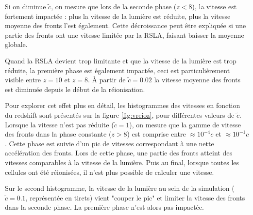 Si on diminue $\tilde{c}$, on mesure que lors de la seconde phase ($z<8$), la vitesse est fortement impactée : plus la vitesse de la lumière est réduite, plus la vitesse moyenne des fronts l'est également.
Cette décroissance peut être expliquée si une partie des fronts ont une vitesse limitée par la \ac{RSLA}, faisant baisser la moyenne globale.

Quand la \ac{RSLA} devient trop limitante et que la vitesse de la lumière est trop réduite, la première phase est également impactée, ceci est particulièrement visible entre $z=10$ et $z=8$.
À partir de $\tilde{c}=0.02$ la vitesse moyenne des fronts est diminuée depuis le début de la réionisation.

Pour explorer cet effet plus en détail, les histogrammes des vitesses en fonction du redshift sont présentés sur la figure \ref{fig:vreioz}, pour différentes valeurs de $\tilde{c}$.
Lorsque la vitesse n'est pas réduite ($\tilde{c}=1$), on mesure que la gamme de vitesse des fronts dans la phase constante ($z>8$) est comprise entre $\approx 10^{-4}c$ et $\approx 10^{-1}c$.
Cette phase est suivie d'un pic de vitesses correspondant à une nette accélération des fronts.
Lors de cette phase, une partie des fronts atteint des vitesses comparables à la vitesse de la lumière.
Puis au final, lorsque toutes les cellules ont été réionisées, il n'est plus possible de calculer une vitesse.

Sur le second histogramme, la vitesse de la lumière au sein de la simulation ($\tilde{c}=0.1$, représentée en tirets) vient "couper le pic" et limiter la vitesse des fronts dans la seconde phase.
La première phase n'est alors pas impactée.


